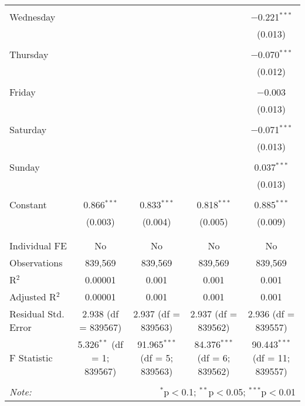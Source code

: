 \documentclass[
]{article}
\begin{document}
\begin{table}[!htbp]
{\begin{tabular}{@{\extracolsep{5pt}}lcccc}
  & & & & \\ 
 Wednesday &  &  &  & $-$0.221$^{***}$ \\ 
  &  &  &  & (0.013) \\ 
  & & & & \\ 
 Thursday &  &  &  & $-$0.070$^{***}$ \\ 
  &  &  &  & (0.012) \\ 
  & & & & \\ 
 Friday &  &  &  & $-$0.003 \\ 
  &  &  &  & (0.013) \\ 
  & & & & \\ 
 Saturday &  &  &  & $-$0.071$^{***}$ \\ 
  &  &  &  & (0.013) \\ 
  & & & & \\ 
 Sunday &  &  &  & 0.037$^{***}$ \\ 
  &  &  &  & (0.013) \\ 
  & & & & \\ 
 Constant & 0.866$^{***}$ & 0.833$^{***}$ & 0.818$^{***}$ & 0.885$^{***}$ \\ 
  & (0.003) & (0.004) & (0.005) & (0.009) \\ 
  & & & & \\ 
\hline \\[-1.8ex] 
Individual FE & No & No & No & No \\ 
Observations & 839,569 & 839,569 & 839,569 & 839,569 \\ 
R$^{2}$ & 0.00001 & 0.001 & 0.001 & 0.001 \\ 
Adjusted R$^{2}$ & 0.00001 & 0.001 & 0.001 & 0.001 \\ 
Residual Std. Error & 2.938 (df = 839567) & 2.937 (df = 839563) & 2.937 (df = 839562) & 2.936 (df = 839557) \\ 
F Statistic & 5.326$^{**}$ (df = 1; 839567) & 91.965$^{***}$ (df = 5; 839563) & 84.376$^{***}$ (df = 6; 839562) & 90.443$^{***}$ (df = 11; 839557) \\ 
\hline 
\hline \\[-1.8ex] 
\textit{Note:}  & \multicolumn{4}{r}{$^{*}$p$<$0.1; $^{**}$p$<$0.05; $^{***}$p$<$0.01} \\ 
\end{tabular}
} 
\end{table} 
\newpage
\end{document}
